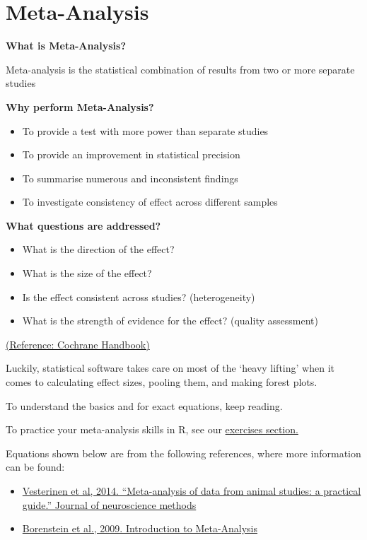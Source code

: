 \documentclass[
]{book}
\begin{document}
\hypertarget{meta-analysis}{%
\chapter{Meta-Analysis}\label{meta-analysis}}

\textbf{What is Meta-Analysis?}

Meta-analysis is the statistical combination of results from two or more separate studies

\textbf{Why perform Meta-Analysis?}

\begin{itemize}
\item
  To provide a test with more power than separate studies
\item
  To provide an improvement in statistical precision
\item
  To summarise numerous and inconsistent findings
\item
  To investigate consistency of effect across different samples
\end{itemize}

\textbf{What questions are addressed?}

\begin{itemize}
\item
  What is the direction of the effect?
\item
  What is the size of the effect?
\item
  Is the effect consistent across studies? (heterogeneity)
\item
  What is the strength of evidence for the effect? (quality assessment)
\end{itemize}

\href{http://www.cochrane-handbook.org/}{(Reference: Cochrane Handbook)}

Luckily, statistical software takes care on most of the `heavy lifting' when it comes to calculating effect sizes, pooling them, and making forest plots.

To understand the basics and for exact equations, keep reading.

To practice your meta-analysis skills in R, see our \href{Exercises.html}{exercises section.}

Equations shown below are from the following references, where more information can be found:

\begin{itemize}
\item
  \href{https://doi.org/10.1016/j.jneumeth.2013.09.010}{Vesterinen et al, 2014. ``Meta-analysis of data from animal studies: a practical guide.'' Journal of neuroscience methods}
\item
  \href{https://doi.org/10.1002/9780470743386}{Borenstein et al., 2009. Introduction to Meta-Analysis}
\end{itemize}
\end{document}
